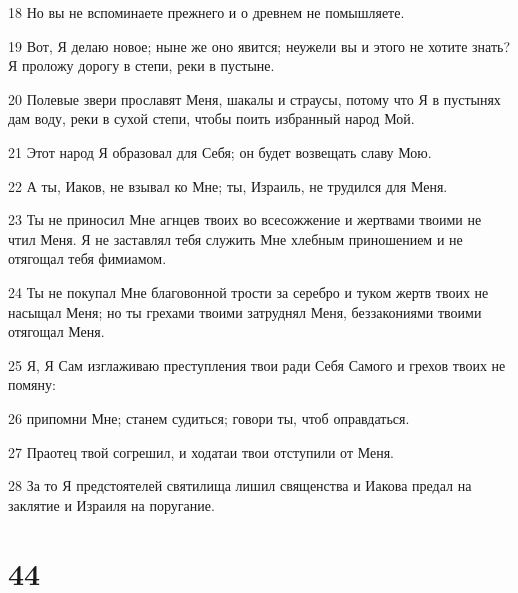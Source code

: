 \par 18 Но вы не вспоминаете прежнего и о древнем не помышляете.
\par 19 Вот, Я делаю новое; ныне же оно явится; неужели вы и этого не хотите знать? Я проложу дорогу в степи, реки в пустыне.
\par 20 Полевые звери прославят Меня, шакалы и страусы, потому что Я в пустынях дам воду, реки в сухой степи, чтобы поить избранный народ Мой.
\par 21 Этот народ Я образовал для Себя; он будет возвещать славу Мою.
\par 22 А ты, Иаков, не взывал ко Мне; ты, Израиль, не трудился для Меня.
\par 23 Ты не приносил Мне агнцев твоих во всесожжение и жертвами твоими не чтил Меня. Я не заставлял тебя служить Мне хлебным приношением и не отягощал тебя фимиамом.
\par 24 Ты не покупал Мне благовонной трости за серебро и туком жертв твоих не насыщал Меня; но ты грехами твоими затруднял Меня, беззакониями твоими отягощал Меня.
\par 25 Я, Я Сам изглаживаю преступления твои ради Себя Самого и грехов твоих не помяну:
\par 26 припомни Мне; станем судиться; говори ты, чтоб оправдаться.
\par 27 Праотец твой согрешил, и ходатаи твои отступили от Меня.
\par 28 За то Я предстоятелей святилища лишил священства и Иакова предал на заклятие и Израиля на поругание.

\chapter{44}

